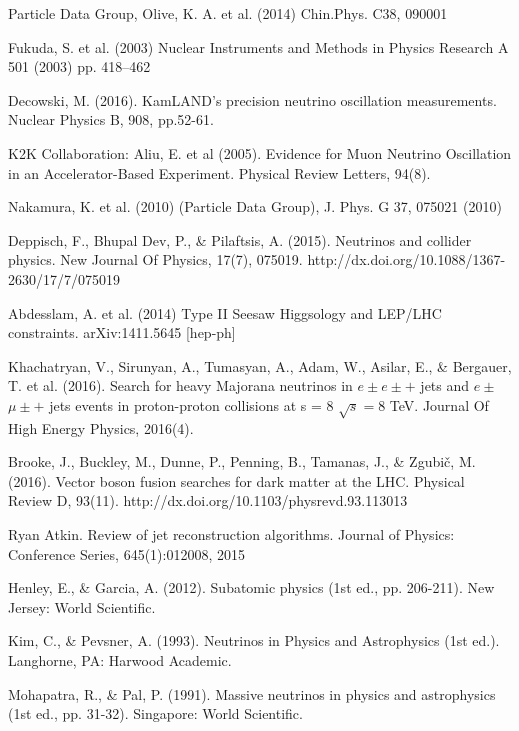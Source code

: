 \documentclass[11pt]{book}
\begin{document}
\begin{thebibliography}{10}

Particle Data Group, Olive, K. A. et al. (2014) Chin.Phys. C38, 090001 


 Fukuda, S. et al. (2003) Nuclear Instruments and Methods in Physics Research A 501 (2003) pp. 418–462

 Decowski, M. (2016). KamLAND's precision neutrino oscillation measurements. Nuclear Physics B, 908, pp.52-61.

 K2K Collaboration: Aliu, E. et al (2005). Evidence for Muon Neutrino Oscillation in an Accelerator-Based Experiment. Physical Review Letters, 94(8).

Nakamura, K. et al. (2010) (Particle Data Group), J. Phys. G 37, 075021 (2010) 

 Deppisch, F., Bhupal Dev, P., \& Pilaftsis, A. (2015). Neutrinos and collider physics. New Journal Of Physics, 17(7), 075019. http://dx.doi.org/10.1088/1367-2630/17/7/075019

 Abdesslam, A. et al. (2014) Type II Seesaw Higgsology and LEP/LHC constraints. arXiv:1411.5645 [hep-ph]

 Khachatryan, V., Sirunyan, A., Tumasyan, A., Adam, W., Asilar, E., \& Bergauer, T. et al. (2016). Search for heavy Majorana neutrinos in $e\pm e\pm +$ jets and $e\pm$ $\mu \pm +$ jets events in proton-proton collisions at s = 8 $\sqrt{s}=8$ TeV. Journal Of High Energy Physics, 2016(4).

 Brooke, J., Buckley, M., Dunne, P., Penning, B., Tamanas, J., \& Zgubič, M. (2016). Vector boson fusion searches for dark matter at the LHC. Physical Review D, 93(11). http://dx.doi.org/10.1103/physrevd.93.113013

 Ryan Atkin.  Review of jet reconstruction algorithms. Journal of Physics: Conference Series, 645(1):012008, 2015

 Henley, E., \& Garcia, A. (2012). Subatomic physics (1st ed., pp. 206-211). New Jersey: World Scientific.

 Kim, C., \& Pevsner, A. (1993). Neutrinos in Physics and Astrophysics (1st ed.). Langhorne, PA: Harwood Academic.

 Mohapatra, R., \& Pal, P. (1991). Massive neutrinos in physics and astrophysics (1st ed., pp. 31-32). Singapore: World Scientific.


\end{thebibliography}
\end{document}

